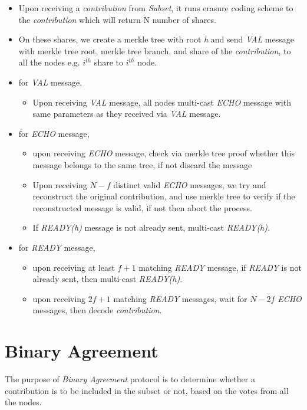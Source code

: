 \begin{itemize}
    \item Upon receiving a \textit{contribution} from \textit{Subset}, it runs erasure coding scheme to the \textit{contribution} which will return N number of shares.
    \item On these shares, we create a merkle tree with root \textit{h} and send \textit{VAL} message with merkle tree root, merkle tree branch, and share of the \textit{contribution},
   to all the nodes e.g. $i^{th}$ share to $i^{th}$ node.
    \item for \textit{VAL} message,
    \begin{itemize}
        \item Upon receiving \textit{VAL} message, all nodes multi-cast \textit{ECHO} message with same parameters as they received via \textit{VAL} message.
    \end{itemize}
    \item for \textit{ECHO} message,
    \begin{itemize}
        \item upon receiving \textit{ECHO} message, check via merkle tree proof whether this message belongs to the same tree, if not discard the message
        \item Upon receiving $N-f$ distinct valid \textit{ECHO} messages, we try and reconstruct the original contribution, and use merkle tree to verify if the reconstructed message is valid, if not then abort the process.
        \item If \textit{READY(h)} message is not already sent, multi-cast \textit{READY(h)}.
    \end{itemize}
    \item for \textit{READY} message,
    \begin{itemize}
        \item upon receiving at least $f+1$ matching \textit{READY} message, if \textit{READY} is not already sent, then multi-cast \textit{READY(h)}.
        \item upon receiving $2f+1$ matching \textit{READY} messages, wait for $N-2f$ \textit{ECHO} messages, then decode \textit{contribution}. 
    \end{itemize}
\end{itemize}
\section{Binary Agreement}
The purpose of \textit{Binary Agreement} protocol is to determine whether a contribution is to be included in the subset or not, based on the votes from all the nodes.

